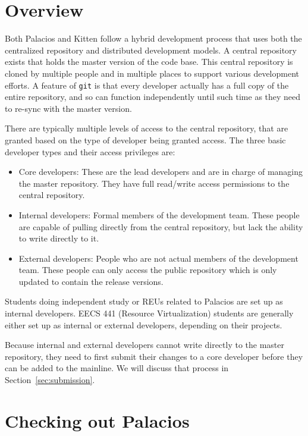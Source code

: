 \documentclass[11pt]{article}
\begin{document}
\section{Overview}


Both Palacios and Kitten follow a hybrid development process that
uses both the centralized repository and distributed development
models. A central repository exists that holds the master version of
the code base. This central repository is cloned by multiple people
and in multiple places to support various development efforts. A
feature of \texttt{git} is that every developer actually has a full copy of
the entire repository, and so can function independently until such
time as they need to re-sync with the master version. 

There are typically multiple levels of access to the central
repository, that are granted based on the type of developer being
granted access. The three basic developer types and their access
privileges are:

\begin{itemize}
\item Core developers: These are the lead developers and are in
charge of managing the master repository. They have full read/write
access permissions to the central repository.

\item Internal developers: Formal members of the development
team. These people are capable of pulling directly from the central
repository, but lack the ability to write directly to it. 

\item External developers: People who are not actual members of the
development team. These people can only access the public repository
which is only updated to contain the release versions. 
\end{itemize}

Students doing independent study or REUs related to Palacios are set
up as internal developers.  EECS 441 (Resource Virtualization)
students are generally either set up as internal or external
developers, depending on their projects.

Because internal and external developers cannot write directly to the
master repository, they need to first submit their changes to a core
developer before they can be added to the mainline. We will discuss
that process in Section~\ref{sec:submission}.


\section{Checking out Palacios}
\end{document}
